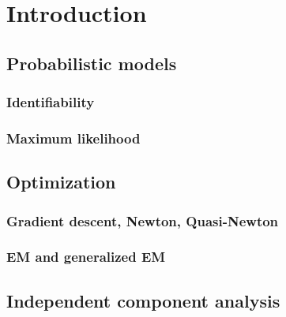 \documentclass{report}
\begin{document}
\tableofcontents
\printunsrtglossary[type=symbols,style=long, title=Notations]



\chapter{Introduction}
\section{Probabilistic models}
\subsection{Identifiability}
\subsection{Maximum likelihood}
\section{Optimization}
\subsection{Gradient descent, Newton, Quasi-Newton}
\subsection{EM and generalized EM}
\section{Independent component analysis}
\end{document}
